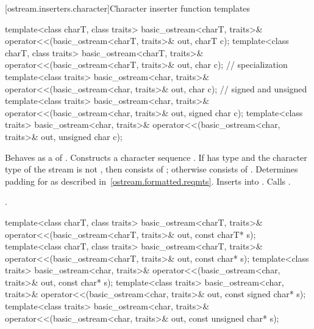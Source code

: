 [ostream.inserters.character]{Character inserter function templates}

%
\begin{itemdecl}
template<class charT, class traits>
  basic_ostream<charT, traits>& operator<<(basic_ostream<charT, traits>& out, charT c);
template<class charT, class traits>
  basic_ostream<charT, traits>& operator<<(basic_ostream<charT, traits>& out, char c);
// specialization
template<class traits>
  basic_ostream<char, traits>& operator<<(basic_ostream<char, traits>& out, char c);
// signed and unsigned
template<class traits>
  basic_ostream<char, traits>& operator<<(basic_ostream<char, traits>& out, signed char c);
template<class traits>
  basic_ostream<char, traits>& operator<<(basic_ostream<char, traits>& out, unsigned char c);
\end{itemdecl}

\begin{itemdescr}
\pnum
\effects
Behaves as a 
of . Constructs a character sequence .
If  has type
and the character type of the stream is not
,
then  consists of
;
otherwise  consists of
. Determines padding for  as described
in~\ref{ostream.formatted.reqmts}. Inserts  into
. Calls .

\pnum
\returns
{}.
\end{itemdescr}

%
\begin{itemdecl}
template<class charT, class traits>
  basic_ostream<charT, traits>& operator<<(basic_ostream<charT, traits>& out, const charT* s);
template<class charT, class traits>
  basic_ostream<charT, traits>& operator<<(basic_ostream<charT, traits>& out, const char* s);
template<class traits>
  basic_ostream<char, traits>& operator<<(basic_ostream<char, traits>& out, const char* s);
template<class traits>
  basic_ostream<char, traits>& operator<<(basic_ostream<char, traits>& out, const signed char* s);
template<class traits>
  basic_ostream<char, traits>& operator<<(basic_ostream<char, traits>& out,
                                          const unsigned char* s);
\end{itemdecl}

